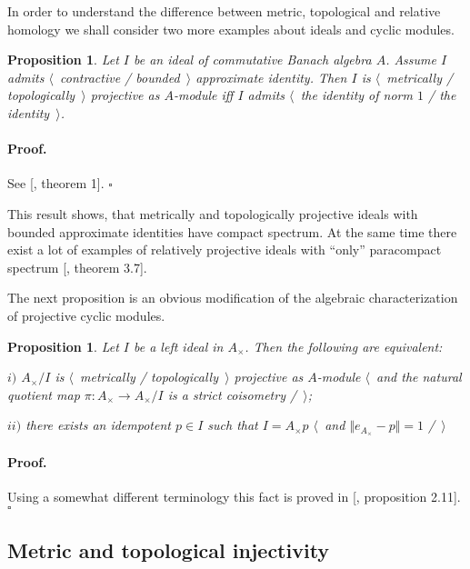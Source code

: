 \documentclass[12pt]{article}
\newtheorem{proposition}[theorem]{Proposition}
\renewenvironment{proof}{\paragraph{Proof.}}{\hfill$\square$\medskip}
\begin{document}
In order to understand the difference between metric, topological and relative homology we shall consider two more examples about ideals and cyclic modules.

\begin{proposition}\label{GoodCommIdealMetTopProjIsUnital} Let $I$ be an ideal of commutative Banach algebra $A$. Assume $I$ admits $\langle$~contractive / bounded~$\rangle$ approximate identity. Then $I$ is $\langle$~metrically / topologically~$\rangle$ projective as $A$-module iff $I$ admits $\langle$~the identity of norm $1$ / the identity~$\rangle$.
\end{proposition}
\begin{proof} See [\cite{NemMetTopProjIdBanAlg}, theorem 1].
\end{proof}

This result shows, that metrically and topologically projective ideals with bounded approximate identities have compact spectrum. At the same time there exist a lot of examples of relatively projective ideals with ``only'' paracompact spectrum  [\cite{HelHomolBanTopAlg}, theorem 3.7].

The next proposition is an obvious modification of the algebraic characterization of projective cyclic modules. 


\begin{proposition}\label{MetTopProjCycModCharac} Let $I$ be a left ideal in $A_\times $. Then the following are equivalent:

$i)$ $A_\times /I$ is $\langle$~metrically / topologically~$\rangle$ projective as $A$-module $\langle$~and the natural quotient map $\pi:A_\times \to A_\times /I$ is a strict coisometry /~$\rangle$;

$ii)$ there exists an idempotent $p\in I$ such that $I=A_\times  p$ $\langle$~and $\Vert e_{A_\times }-p\Vert= 1$ /~$\rangle$
\end{proposition}
\begin{proof} Using a somewhat different terminology this fact is proved in [\cite{WhiteInjmoduAlg}, proposition 2.11].
\end{proof}



\subsection{Metric and topological injectivity}
\label{SubSectionMetricAndTopologicalInjectivity}
\end{document}
